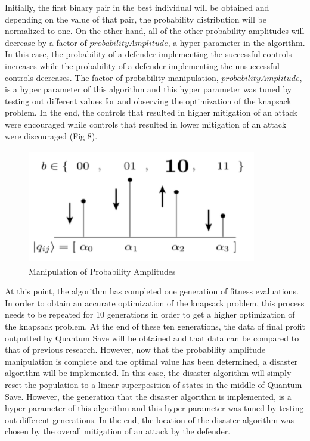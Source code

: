 Initially, the first binary pair in the best individual will be obtained and depending on the value of that pair, the probability distribution will be normalized to one. On the other hand, all of the other probability amplitudes will decrease by a factor of $probabilityAmplitude$, a hyper parameter in the algorithm. In this case, the probability of a defender implementing the successful controls increases while the probability of a defender implementing the unsuccessful controls decreases. The factor of probability manipulation, $probabilityAmplitude$, is a hyper parameter of this algorithm and this hyper parameter was tuned by testing out different values for and observing the optimization of the knapsack problem. In the end, the controls that resulted in higher mitigation of an attack were encouraged while controls that resulted in lower mitigation of an attack were discouraged (Fig 8).

\begin{figure}[ht]%
\centering
\includegraphics[width=10cm,height=5cm]{Images/amplitude-man.png}
\caption{Manipulation of Probability Amplitudes}%
\end{figure}

At this point, the algorithm has completed one generation of fitness evaluations. In order to obtain an accurate optimization of the knapsack problem, this process needs to be repeated for 10 generations in order to get a higher optimization of the knapsack problem. At the end of these ten generations, the data of final profit outputted by Quantum Save will be obtained and that data can be compared to that of previous research. However, now that the probability amplitude manipulation is complete and the optimal value has been determined, a disaster algorithm will be implemented. In this case, the disaster algorithm will simply reset the population to a linear superposition of states in the middle of Quantum Save. However, the generation that the disaster algorithm is implemented, is a hyper parameter of this algorithm and this hyper parameter was tuned by testing out different generations. In the end, the location of the disaster algorithm was chosen by the overall mitigation of an attack by the defender.

